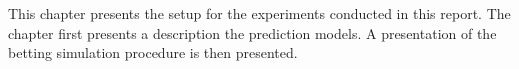 This chapter presents the setup for the experiments conducted in this report. The chapter first presents a description the prediction models. A presentation of the betting simulation procedure is then presented.